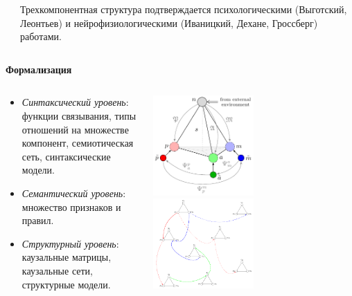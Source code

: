 \documentclass[default]{beamer}
\begin{document}
\begin{frame}
\begin{columns}
\begin{column}{0.6\textwidth}
\begin{columns}
\begin{column}{0.4\textwidth}
					\end{column}
					\begin{column}{0.6\textwidth}
						Трехкомпонентная структура подтверждается психологическими (Выготский, Леонтьев) и нейрофизиологическими (Иваницкий, Дехане, Гроссберг) работами.
					\end{column}
				\end{columns}
					\textbf{{\scriptsize Формализация}}
						\begin{columns}
							\begin{column}{0.5\textwidth}
								\begin{itemize}
								\item \textit{Синтаксический уровень}: функции связывания, типы отношений на множестве компонент, семиотическая сеть, синтаксические модели.
								\item \textit{Семантический уровень}: множество признаков и правил.
								\item \textit{Структурный уровень}: каузальные матрицы, каузальные сети, структурные модели.
							\end{itemize}
							\end{column}
							\begin{column}{0.5\textwidth}
								\begin{center}
									\includegraphics[width=0.5\textwidth]{signs/en/sign_naming_colored_en}
									\includegraphics[width=0.5\textwidth]{signnet/signs_net}
									

\end{center}
\end{column}
\end{columns}
\end{column}
\end{columns}
\end{frame}
\end{document}

